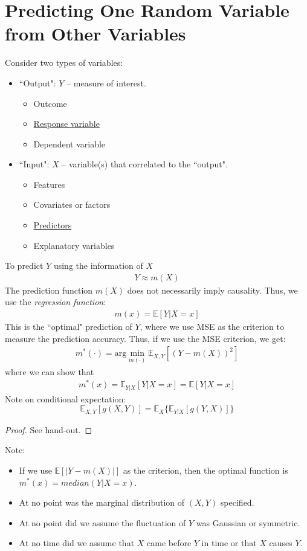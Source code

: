 \documentclass{article}
\newcommand{\E}{\mathbb{E}}
\begin{document}
\section{Predicting One Random Variable from Other Variables}
Consider two types of variables:
\begin{itemize}
    \item ``Output": $Y$ -- measure of interest.
    \begin{itemize}
        \item Outcome
        \item \underline{Response variable}
        \item Dependent variable
    \end{itemize}
    \item ``Input": $X$ -- variable(s) that correlated to the ``output".
    \begin{itemize}
        \item Features
        \item Covariates or factors
        \item \underline{Predictors}
        \item Explanatory variables
    \end{itemize}
\end{itemize}
To predict $Y$ using the information of $X$
\begin{align}
    Y \approx m(X)
\end{align}
The prediction function $m(X)$ does not necessarily imply causality. Thus, we use the \textit{regression function}:
\begin{align}
    m(x) = \E[Y | X = x]
\end{align}
This is the ``optimal" prediction of $Y$, where we use MSE as the criterion to measure the prediction accuracy. Thus, if we use the MSE criterion, we get:
\begin{align}
    m^*(\cdot) = \text{arg}\min_{m(\cdot)} \E_{X,Y}[(Y - m(X))^2]
\end{align}
where we can show that
\begin{align}
    m^*(x) = \E_{Y|X}[Y| X = x] = \E[Y|X = x]
\end{align}
Note on conditional expectation:
\[\E_{X,Y}[g(X,Y)] = \E_X\{\E_{Y|X}[g(Y,X)]\}\]
\begin{proof}
    See hand-out.
\end{proof}
\noindent
Note:
\begin{itemize}
    \item If we use $\E[|Y - m(X)|]$ as the criterion, then the optimal function is $m^*(x) = median(Y | X = x)$.
    \item At no point was the marginal distribution of $(X,Y)$ specified.
    \item At no point did we assume the fluctuation of $Y$ was Gaussian or symmetric.
    \item At no time did we assume that $X$ came before $Y$ in time or that $X$ causes $Y$.
\end{itemize}
\end{document}
